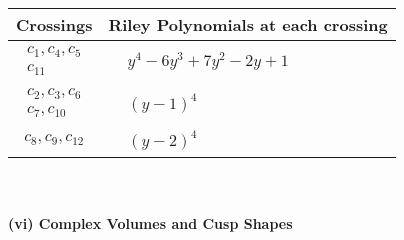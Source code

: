 \documentclass[1p]{elsarticle_modified}
\theoremstyle{definition}
\begin{document}
\begin{tabular}{m{50pt}|m{274pt}}
Crossings & \hspace{64pt}Riley Polynomials at each crossing \\
\hline $$\begin{aligned}c_{1},c_{4},c_{5}\\c_{11}\end{aligned}$$&$\begin{aligned}
&y^4-6 y^3+7 y^2-2 y+1
\end{aligned}$\\
\hline $$\begin{aligned}c_{2},c_{3},c_{6}\\c_{7},c_{10}\end{aligned}$$&$\begin{aligned}
&(y-1)^4
\end{aligned}$\\
\hline $$\begin{aligned}c_{8},c_{9},c_{12}\end{aligned}$$&$\begin{aligned}
&(y-2)^4
\end{aligned}$\\
\hline
\end{tabular}\\~\\
\newpage\flushleft \textbf{(vi) Complex Volumes and Cusp Shapes}
\end{document}
